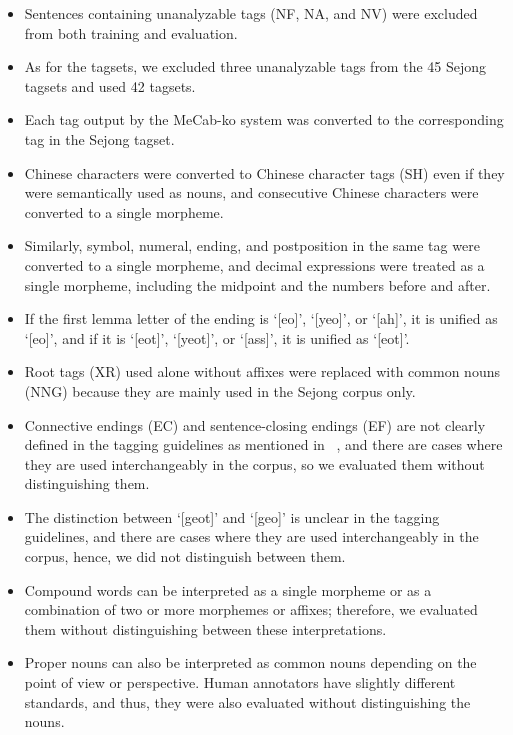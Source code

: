 \documentclass[AMS,STIX2COL]{WileyNJD-v2}
\begin{document}
    \begin{itemize}
        \item Sentences containing unanalyzable tags (NF, NA, and NV) were excluded from both training and evaluation.
        \item As for the tagsets, we excluded three unanalyzable tags from the 45 Sejong tagsets and used 42 tagsets.
        \item Each tag output by the MeCab-ko system was converted to the corresponding tag in the Sejong tagset.
        \item Chinese characters were converted to Chinese character tags (SH) even if they were semantically used as nouns, and consecutive Chinese characters were converted to a single morpheme.
        \item Similarly, symbol, numeral, ending, and postposition in the same tag were converted to a single morpheme, and decimal expressions were treated as a single morpheme, including the midpoint and the numbers before and after.
        \item If the first lemma letter of the ending is `[eo]', `[yeo]', or `[ah]', it is unified as `[eo]', and if it is `[eot]', `[yeot]', or `[ass]', it is unified as `[eot]'. %
        \item Root tags (XR) used alone without affixes were replaced with common nouns (NNG) because they are mainly used in the Sejong corpus only.
        \item Connective endings (EC) and sentence-closing endings (EF) are not clearly defined in the tagging guidelines as mentioned in ~\cite{KimIH2010}, and there are cases where they are used interchangeably in the corpus, so we evaluated them without distinguishing them.
        \item The distinction between `[geot]' and `[geo]' is unclear in the tagging guidelines, and there are cases where they are used interchangeably in the corpus, hence, we did not distinguish between them. %
        \item Compound words can be interpreted as a single morpheme or as a combination of two or more morphemes or affixes; therefore, we evaluated them without distinguishing between these interpretations.
        \item Proper nouns can also be interpreted as common nouns depending on the point of view or perspective. Human annotators have slightly different standards, and thus, they were also evaluated without distinguishing the nouns.
    \end{itemize}
\end{document}
